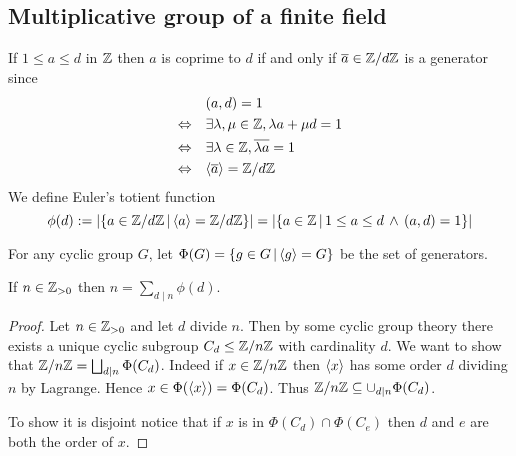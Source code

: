 \subsection{Multiplicative group of a finite field}
\begin{dfn}
    If $1 \le a \le d$ in $\mathbb{Z}$ then $a$ is coprime to $d$
    if and only if $\overline{a} \in \mathbb{Z} / d \mathbb{Z}$ is a generator since
    \begin{align*}
            & (a,d) = 1 \\
        \Leftrightarrow \quad & \exists \lambda, \mu \in \mathbb{Z}, \lambda a + \mu d = 1\\
        \Leftrightarrow \quad & \exists \lambda \in \mathbb{Z}, \overline{\lambda a} = 1\\
        \Leftrightarrow \quad & \langle \overline{a} \rangle = \mathbb{Z} / d \mathbb{Z}
    \end{align*}
    We define Euler's totient function 
    \[
        \phi(d) := \left\vert \left\{a \in \mathbb{Z} / d \mathbb{Z} \,|\, \langle a\rangle = \mathbb{Z} / d \mathbb{Z}\right\} \right\vert = 
        \left\vert \left\{a \in \mathbb{Z} \,|\, 1 \le a \le d \, \land \, (a,d) = 1\right\} \right\vert
    \]
\end{dfn}

\begin{nttn}
    For any cyclic group $G$, 
    let $\Phi(G) = \{g \in G \,|\, \langle g\rangle = G\}$ 
    be the set of generators.
\end{nttn}

\begin{prop}
    If $n \in \mathbb{Z}_{>0}$ then $n = \sum_{d \mid n} \phi(d)$.
\end{prop}
\begin{proof}
    Let $n \in \mathbb{Z}_{>0}$ and let $d$ divide $n$. 
    Then by some cyclic group theory there exists a unique cyclic subgroup 
    $C_d \le \mathbb{Z} /n \mathbb{Z}$ with cardinality $d$.
    We want to show that $\mathbb{Z} / n \mathbb{Z} = \bigsqcup_{d \mid n} \Phi(C_d)$.
    Indeed if $x \in \mathbb{Z} / n \mathbb{Z}$ then $\langle x\rangle$ has some order $d$ 
    dividing $n$ by Lagrange.
    Hence $x \in \Phi(\langle x\rangle) = \Phi(C_d)$.
    Thus $\mathbb{Z} / n\mathbb{Z} \subseteq \cup_{d \mid n} \Phi(C_d)$.

    To show it is disjoint notice that if $x$ is in 
    $\Phi(C_d) \cap \Phi (C_e)$ then 
    $d$ and $e$ are both the order of $x$.
\end{proof}


